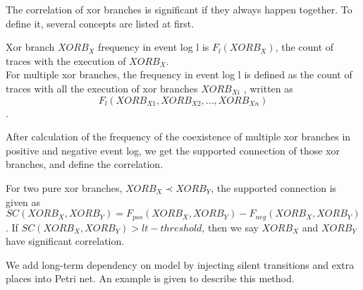 The correlation of xor branches is significant if they always happen together. To define it, several concepts are listed at first. 
\begin{definition}
	Xor branch $XORB_X$ frequency in event log l is $F_{l}(XORB_X)$, the count of traces with the execution of $XORB_X$. \\
	For multiple xor branches, the frequency in event log l is defined as the count of traces with all the execution of xor branches $XORB_{Xi}$ , written as \[F_{l}(XORB_{X1}, XORB_{X2},...,XORB_{Xn})\].
\end{definition}
After calculation of the frequency of the coexistence of multiple xor branches in positive and negative event log, we get the supported connection of those xor branches, and define the correlation. 
\begin{definition}
	\label{def: supported-connection}
	For two pure xor branches, $XORB_X \prec XORB_Y$, the supported connection is given as \[SC(XORB_X,XORB_Y)= F_{pos}(XORB_X, XORB_Y) -F_{neg}(XORB_X, XORB_Y)\]. If $SC(XORB_X,XORB_Y) > lt-threshold$, then we say $XORB_X$ and $XORB_Y$ have significant correlation.
\end{definition}
We add long-term dependency on model by injecting silent transitions and extra places into Petri net. 
An example is given to describe this method.
